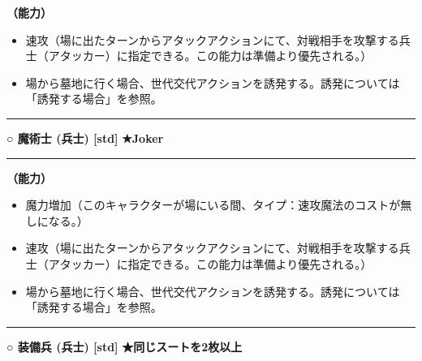 \documentclass[twocolumn,a5paper,papersize,10pt]{jarticle}
\begin{document}
{\bf（能力）}


\vspace{-1zh}%
\begin{itemize}
\setlength{\leftskip}{-0.3cm}
\setlength{\parskip}{0pt} %

\item 速攻（場に出たターンからアタックアクションにて、対戦相手を攻撃する兵士（アタッカー）に指定できる。この能力は準備より優先される。）

\item 場から墓地に行く場合、世代交代アクションを誘発する。誘発については「誘発する場合」を参照。
\vspace{-1zh}%
\end{itemize}
\vspace{2mm} %
\hrule height 0.5mm depth 0mm width 66.5mm %
\vspace{1mm} %
{\small\bf ○ 魔術士 {\scriptsize (兵士) [std]}} %
\hfill 
{\footnotesize\bf ★Joker }

\vspace{1mm}%
\hrule height 0.1mm depth 0mm width 66.5mm %
\vspace{1mm}%

{\bf（能力）}


\vspace{-1zh}%
\begin{itemize}
\setlength{\leftskip}{-0.3cm}
\setlength{\parskip}{0pt} %

\item 魔力増加（このキャラクターが場にいる間、タイプ：速攻魔法のコストが無しになる。）

\item 速攻（場に出たターンからアタックアクションにて、対戦相手を攻撃する兵士（アタッカー）に指定できる。この能力は準備より優先される。）

\item 場から墓地に行く場合、世代交代アクションを誘発する。誘発については「誘発する場合」を参照。
\vspace{-1zh}%
\end{itemize}
\vspace{2mm} %
\hrule height 0.5mm depth 0mm width 66.5mm %
\vspace{1mm} %
{\small\bf ○ 装備兵 {\scriptsize (兵士) [std]}} %
\hfill 
{\footnotesize\bf ★同じスートを2枚以上 }
\end{document}

